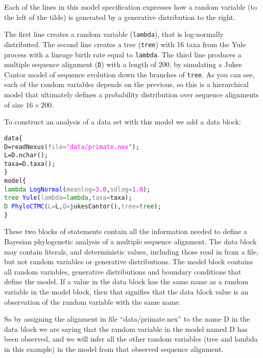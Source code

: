 \documentclass[10pt,letterpaper,table]{article}
\begin{document}
Each of the lines in this model specification expresses how a random
variable (to the left of the tilde) is generated by a generative
distribution to the right.

The first line creates a random variable (\texttt{lambda}), that is
log-normally distributed.
The second line creates a tree (\texttt{tree}) with 16 taxa from the
Yule process with a lineage birth rate equal to \texttt{lambda}.
The third line produces a multiple sequence alignment (\texttt{D})
with a length of 200, by simulating a Jukes Cantor model of sequence
evolution down the branches of  \texttt{tree}.
As you can see, each of the random variables depends on the previous,
so this is a hierarchical model that ultimately defines a probability
distribution over sequence alignments of size $16 \times 200$.

To construct an analysis of a data set with this model we add a data block:

{\small
\begin{alltt}
data \{
  D = \textcolor{magenta!80!black}{readNexus}(\textcolor{gray}{file=}\textcolor{magenta}{"data/primate.nex"});
  L = D.\textcolor{magenta!80!black}{nchar}();
  taxa = D.\textcolor{magenta!80!black}{taxa}();
\}
model \{
  \textcolor{green}{lambda} ~ \textcolor{blue}{LogNormal}(\textcolor{gray}{meanlog=}\textcolor{magenta}{3.0}, \textcolor{gray}{sdlog=}\textcolor{magenta}{1.0});
  \textcolor{green}{tree} ~ \textcolor{blue}{Yule}(\textcolor{gray}{lambda=}\textcolor{green}{lambda}, \textcolor{gray}{taxa=}taxa);
  \textcolor{green}{D} ~ \textcolor{blue}{PhyloCTMC}(\textcolor{gray}{L=}L, \textcolor{gray}{Q=}\textcolor{magenta!80!black}{jukesCantor}(), \textcolor{gray}{tree=}\textcolor{green}{tree});
\}
\end{alltt}}

These two blocks of statements contain all the information needed to define
a Bayesian phylogenetic analysis of a multiple sequence alignment.
The data block may contain literals, and deterministic values, including those read in from a file, but not random variables or generative distributions.
The model block contains all random variables, generative distributions and boundary conditions that define the model.
If a value in the data block has the same name as a random variable in the model block, then that signifies that the data block value is an observation of the random variable with the same name.


So by assigning the alignment in file
``data/primate.nex'' to the name D in the data block we are saying that the random variable in the model named D has
been observed, and we will infer all the other random variables
(tree and lambda in this example) in the model from that observed sequence alignment.
\end{document}
